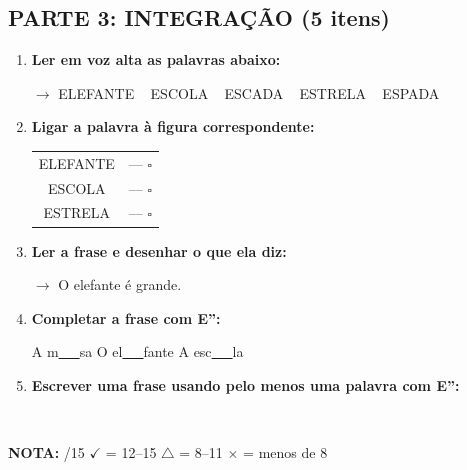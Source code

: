 \begin{exercicio}
\subsection*{PARTE 3: INTEGRAÇÃO (5 itens)}

\begin{enumerate}[resume]
  \item \textbf{Ler em voz alta as palavras abaixo:}
  \begin{center}
  $\rightarrow$ ELEFANTE  ~  ESCOLA  ~  ESCADA  ~  ESTRELA  ~  ESPADA
  \end{center}

  \item \textbf{Ligar a palavra à figura correspondente:}
  \begin{center}
  \begin{tabular}{cc}
  ELEFANTE & \quad --- \quad $\square$ \\
  ESCOLA & \quad --- \quad $\square$ \\
  ESTRELA & \quad --- \quad $\square$
  \end{tabular}
  \end{center}

  \item \textbf{Ler a frase e desenhar o que ela diz:}
  \begin{center}
  $\rightarrow$ O elefante é grande.
  \end{center}
  \begin{center}
  \end{center}

  \item \textbf{Completar a frase com E'':}
  \begin{center}
  A m\underline{~~~}sa \quad O el\underline{~~~}fante \quad A esc\underline{~~~}la
  \end{center}

  \item \textbf{Escrever uma frase usando pelo menos uma palavra com E'':}
  \begin{center}
  \underline{\hspace{12cm}} \\
  \underline{\hspace{12cm}}
  \end{center}
\end{enumerate}

\noindent\textbf{NOTA:} \underline{\hspace{1cm}}/15 \quad $\checkmark$ = 12--15 \quad $\triangle$ = 8--11 \quad $\times$ = menos de 8
\end{exercicio}

